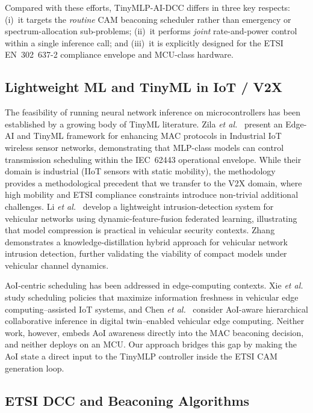 \documentclass[journal]{IEEEtran}
\begin{document}
Compared with these efforts, TinyMLP-AI-DCC differs in three key
respects: (i)~it targets the \emph{routine} CAM beaconing scheduler
rather than emergency or spectrum-allocation sub-problems;
(ii)~it performs \emph{joint} rate-and-power control within a single
inference call; and (iii)~it is explicitly designed for the ETSI
EN~302~637-2 compliance envelope and MCU-class hardware.

\subsection{Lightweight ML and TinyML in IoT / V2X}
\label{subsec:tinyml}

The feasibility of running neural network inference on microcontrollers
has been established by a growing body of TinyML literature.  Zila
\emph{et al.}~\cite{Zila2026} present an Edge-AI and TinyML framework
for enhancing MAC protocols in Industrial IoT wireless sensor networks,
demonstrating that MLP-class models can control transmission scheduling
within the IEC~62443 operational envelope.  While their domain is
industrial (IIoT sensors with static mobility), the methodology
provides a methodological precedent that we transfer to the V2X domain,
where high mobility and ETSI compliance constraints introduce
non-trivial additional challenges.  Li \emph{et al.}~\cite{Li2025}
develop a lightweight intrusion-detection system for vehicular networks
using dynamic-feature-fusion federated learning, illustrating that
model compression is practical in vehicular security contexts.
Zhang~\cite{Zhang2025b} demonstrates a knowledge-distillation hybrid
approach for vehicular network intrusion detection, further validating
the viability of compact models under vehicular channel dynamics.

AoI-centric scheduling has been addressed in edge-computing contexts.
Xie \emph{et al.}~\cite{Xie2025} study scheduling policies that
maximize information freshness in vehicular edge computing--assisted
IoT systems, and Chen \emph{et al.}~\cite{Chen2026} consider
AoI-aware hierarchical collaborative inference in digital
twin--enabled vehicular edge computing.  Neither work, however,
embeds AoI awareness directly into the MAC beaconing decision, and
neither deploys on an MCU.  Our approach bridges this gap by making
the AoI state a direct input to the TinyMLP controller inside the
ETSI CAM generation loop.

\subsection{ETSI DCC and Beaconing Algorithms}
\label{subsec:etsi_dcc}
\end{document}
